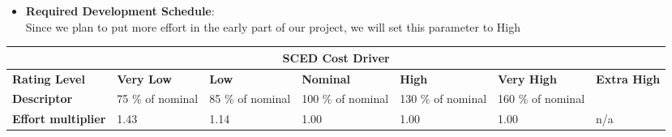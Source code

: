 \begin{itemize}
\item \textbf{Required Development Schedule}:\\
Since we plan to put more effort in the early part of our project, we will set this parameter to High
\end{itemize}
\hspace*{-3cm}\begin{tabular}{|p{3cm}|p{2cm}|p{2cm}|p{2cm}|p{2cm}|p{2cm}|p{2cm}|}
\hline
\multicolumn{7}{|c|}{\textbf{SCED Cost Driver}}\\
\hline
\hline
\textbf{Rating Level} & \textbf{Very Low} & \textbf{Low} & \textbf{Nominal} & \textbf{High} & \textbf{Very High} & \textbf{Extra High}\\
\hline
\textbf{Descriptor} & 75 \% of nominal & 85 \% of nominal & 100 \% of nominal & 130 \% of nominal & 160 \% of nominal & \\
\hline
\textbf{Effort multiplier} & 1.43 & 1.14 & 1.00 & 1.00 & 1.00 & n/a\\
\hline 
\end{tabular}
